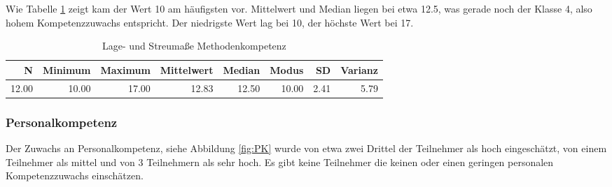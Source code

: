 \documentclass[12pt,smallheadings, bibliography=totoc]{scrartcl}
\begin{document}
Wie Tabelle \ref{tab:lMK} zeigt kam der Wert 10 am häufigsten vor.
Mittelwert und Median liegen bei etwa 12.5, was gerade noch der Klasse
4, also hohem Kompetenzzuwachs entspricht. Der niedrigste Wert lag bei
10, der höchste Wert bei 17.

\begin{table}[H]
\centering
\caption{Lage- und Streumaße Methodenkompetenz}
\label{tab:lMK}
\begin{tabular}{rrrrrrrr}
  \hline
  N & Minimum & Maximum & Mittelwert & Median & Modus & SD & Varianz \\
  \hline
  12.00 & 10.00 & 17.00 & 12.83 & 12.50 & 10.00 & 2.41 & 5.79 \\
   \hline
\end{tabular}
\end{table}

\subsubsection{Personalkompetenz}\label{personalkompetenz}

Der Zuwachs an Personalkompetenz, siehe Abbildung \ref{fig:PK} wurde von
etwa zwei Drittel der Teilnehmer als hoch eingeschätzt, von einem
Teilnehmer als mittel und von 3 Teilnehmern als sehr hoch. Es gibt keine
Teilnehmer die keinen oder einen geringen personalen Kompetenzzuwachs
einschätzen.
\end{document}
